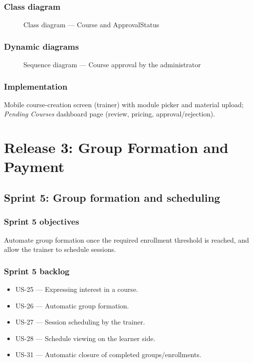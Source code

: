 \documentclass[a4paper,12pt]{report}
\begin{document}
\subsection{Class diagram}
\begin{figure}[H]
\centering
\caption{Class diagram --- Course and ApprovalStatus}
\end{figure}

\subsection{Dynamic diagrams}
\begin{figure}[H]
\centering
\caption{Sequence diagram --- Course approval by the administrator}
\end{figure}

\subsection{Implementation}
Mobile course-creation screen (trainer) with module picker and material
upload; \emph{Pending Courses} dashboard page (review, pricing,
approval/rejection).

\chapter{Release 3: Group Formation and Payment}

\section{Sprint 5: Group formation and scheduling}

\subsection{Sprint 5 objectives}
Automate group formation once the required enrollment threshold is
reached, and allow the trainer to schedule sessions.

\subsection{Sprint 5 backlog}
\begin{itemize}[leftmargin=*]
  \item US-25 --- Expressing interest in a course.
  \item US-26 --- Automatic group formation.
  \item US-27 --- Session scheduling by the trainer.
  \item US-28 --- Schedule viewing on the learner side.
  \item US-31 --- Automatic closure of completed groups/enrollments.
\end{itemize}
\end{document}
